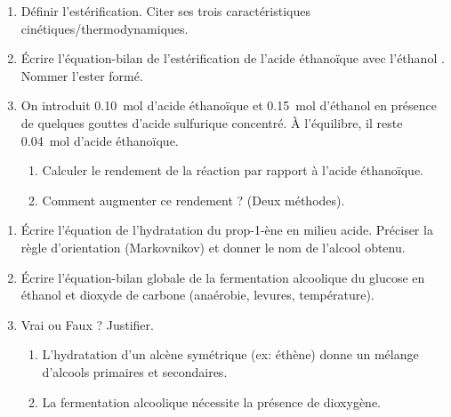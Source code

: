 \documentclass[11pt]{article}
\begin{document}
\begin{exercice}
\begin{enumerate}
    \item Définir l'estérification. Citer ses trois caractéristiques cinétiques/thermodynamiques.
    \item Écrire l'équation-bilan de l'estérification de l'acide éthanoïque  avec l'éthanol . Nommer l'ester formé.
    \item On introduit \SI{0,10}{mol} d'acide éthanoïque et \SI{0,15}{mol} d'éthanol en présence de quelques gouttes d'acide sulfurique concentré. À l'équilibre, il reste \SI{0,04}{mol} d'acide éthanoïque.
    \begin{enumerate}
        \item Calculer le rendement de la réaction par rapport à l'acide éthanoïque.
        \item Comment augmenter ce rendement ? (Deux méthodes).
    \end{enumerate}
\end{enumerate}
\end{exercice}

\begin{exercice}
\begin{enumerate}
    \item Écrire l'équation de l'hydratation du prop-1-ène  en milieu acide. Préciser la règle d'orientation (Markovnikov) et donner le nom de l'alcool obtenu.
    \item Écrire l'équation-bilan globale de la fermentation alcoolique du glucose  en éthanol et dioxyde de carbone (anaérobie, levures, température).
    \item Vrai ou Faux ? Justifier.
    \begin{enumerate}
        \item L'hydratation d'un alcène symétrique (ex: éthène) donne un mélange d'alcools primaires et secondaires.
        \item La fermentation alcoolique nécessite la présence de dioxygène.
    \end{enumerate}
\end{enumerate}
\end{exercice}
\end{document}
